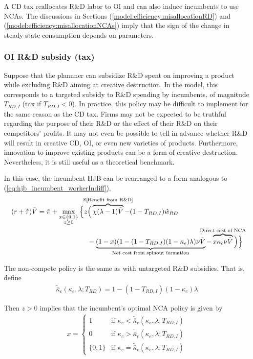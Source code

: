 \documentclass[11pt,english]{article}
\begin{document}
A CD tax reallocates R\&D labor to OI and can also induce incumbents to use NCAs. The discussions in Sections (\ref{model:efficiency:misallocationRD}) and (\ref{model:efficiency:misallocationNCAs}) imply that the sign of the change in steady-state consumption depends on parameters.

\subsubsection{OI R\&D subsidy (tax)}

Suppose that the plannner can subsidize R\&D spent on improving a product while excluding R\&D aiming at creative destruction. In the model, this corresponds to a targeted subsidy to R\&D spending by incumbents, of magnitude $T_{RD,I}$ (tax if $T_{RD,I} < 0$). In practice, this policy may be difficult to implement for the same reason as the CD tax. Firms may not be expected to be truthful regarding the purpose of their R\&D or the effect of their R\&D on their competitors' profits. It may not even be possible to tell in advance whether R\&D will result in creative CD, OI, or even new varieties of products. Furthermore, innovation to improve existing products can be a form of creative destruction. Nevertheless, it is still useful as a theoretical benchmark.

In this case, the incumbent HJB can be rearranged to a form analogous to (\ref{eq:hjb_incumbent_workerIndiff}),
\begin{align}
(r + \hat{\tau}) \tilde{V} = \tilde{\pi} + \max_{\substack{x \in \{0,1\} \\ z \ge 0}} \Big\{z &\Big( \overbrace{\chi (\lambda - 1) \tilde{V}}^{\mathclap{\mathbb{E}[\textrm{Benefit from R\&D}]}}- (1-T_{RD,I}) \hat{w}_{RD} \\
&-  \underbrace{(1-x)(1 - (1-T_{RD,I})(1-\kappa_{e})\lambda)\nu \tilde{V}}_{\mathclap{\text{Net cost from spinout formation}}} - \overbrace{x \kappa_{c} \nu \tilde{V}}^{\mathclap{\text{Direct cost of NCA}}}\Big) \Big\} \label{eq:hjb_incumbent_RDsubsidyTargeted_2}
\end{align}

The non-compete policy is the same as with untargeted R\&D subsidies. That is, define
\begin{align}
\tilde{\bar{\kappa}}_c(\kappa_e,\lambda;T_{RD}) = 1 - (1-T_{RD,I})(1-\kappa_e)\lambda
\end{align} 

Then $z > 0$ implies that the incumbent's optimal NCA policy is given by 
\begin{align}
x = \begin{cases}
1 & \textrm{if } \kappa_{c} < \tilde{\bar{\kappa}}_c (\kappa_e, \lambda;T_{RD,I}) \\
0 & \textrm{if } \kappa_{c} > \tilde{\bar{\kappa}}_c (\kappa_e, \lambda;T_{RD,I})\\
\{0,1\} & \textrm{if } \kappa_c = \tilde{\bar{\kappa}}_c (\kappa_e, \lambda;T_{RD,I})
\end{cases} \label{eq:nca_policy_RDsubsidyTargeted}
\end{align}
\end{document}

